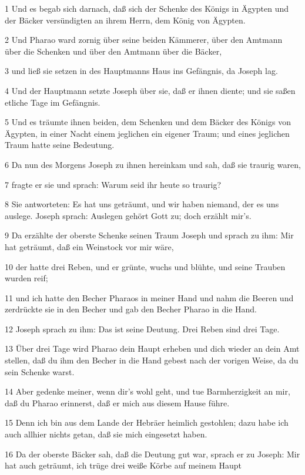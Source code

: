 \par 1 Und es begab sich darnach, daß sich der Schenke des Königs in Ägypten und der Bäcker versündigten an ihrem Herrn, dem König von Ägypten.
\par 2 Und Pharao ward zornig über seine beiden Kämmerer, über den Amtmann über die Schenken und über den Amtmann über die Bäcker,
\par 3 und ließ sie setzen in des Hauptmanns Haus ins Gefängnis, da Joseph lag.
\par 4 Und der Hauptmann setzte Joseph über sie, daß er ihnen diente; und sie saßen etliche Tage im Gefängnis.
\par 5 Und es träumte ihnen beiden, dem Schenken und dem Bäcker des Königs von Ägypten, in einer Nacht einem jeglichen ein eigener Traum; und eines jeglichen Traum hatte seine Bedeutung.
\par 6 Da nun des Morgens Joseph zu ihnen hereinkam und sah, daß sie traurig waren,
\par 7 fragte er sie und sprach: Warum seid ihr heute so traurig?
\par 8 Sie antworteten: Es hat uns geträumt, und wir haben niemand, der es uns auslege. Joseph sprach: Auslegen gehört Gott zu; doch erzählt mir's.
\par 9 Da erzählte der oberste Schenke seinen Traum Joseph und sprach zu ihm: Mir hat geträumt, daß ein Weinstock vor mir wäre,
\par 10 der hatte drei Reben, und er grünte, wuchs und blühte, und seine Trauben wurden reif;
\par 11 und ich hatte den Becher Pharaos in meiner Hand und nahm die Beeren und zerdrückte sie in den Becher und gab den Becher Pharao in die Hand.
\par 12 Joseph sprach zu ihm: Das ist seine Deutung. Drei Reben sind drei Tage.
\par 13 Über drei Tage wird Pharao dein Haupt erheben und dich wieder an dein Amt stellen, daß du ihm den Becher in die Hand gebest nach der vorigen Weise, da du sein Schenke warst.
\par 14 Aber gedenke meiner, wenn dir's wohl geht, und tue Barmherzigkeit an mir, daß du Pharao erinnerst, daß er mich aus diesem Hause führe.
\par 15 Denn ich bin aus dem Lande der Hebräer heimlich gestohlen; dazu habe ich auch allhier nichts getan, daß sie mich eingesetzt haben.
\par 16 Da der oberste Bäcker sah, daß die Deutung gut war, sprach er zu Joseph: Mir hat auch geträumt, ich trüge drei weiße Körbe auf meinem Haupt
